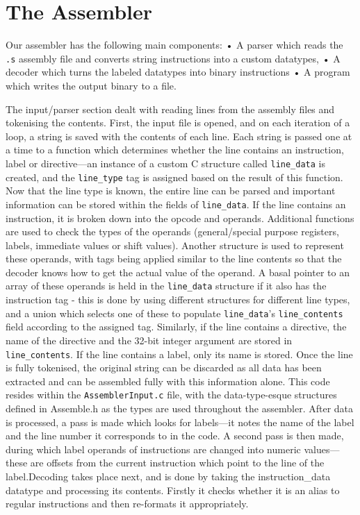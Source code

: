 \documentclass[11pt, oneside, UKenglish]{article}
\begin{document}
\section{The Assembler}
Our assembler has the following main components:
\newline • A parser which reads the \verb|.s| assembly file and converts string instructions into a custom datatypes, 
\newline • A decoder which turns the labeled datatypes into binary instructions 
\newline • A program which writes the output binary to a file.
\par The input/parser section dealt with reading lines from the assembly files and tokenising the contents.
First, the input file is opened, and on each iteration of a loop, a string is saved with the contents of each line.
Each string is passed one at a time to a function which determines whether the line contains an instruction, label or directive---an instance of a custom C structure called \verb|line_data| is created, and the \verb|line_type| tag is assigned based on the result of this function.
Now that the line type is known, the entire line can be parsed and important information can be stored within the fields of \verb|line_data|.
If the line contains an instruction, it is broken down into the opcode and operands.
Additional functions are used to check the types of the operands (general/special purpose registers, labels, immediate values or shift values). Another structure is used to represent these operands, with tags being applied similar to the line contents so that the decoder knows how to get the actual value of the operand.
A basal pointer to an array of these operands is held in the \verb|line_data| structure if it also has the instruction tag - this is done by using different structures for different line types, and a union which selects one of these to populate \verb|line_data|'s \verb|line_contents| field according to the assigned tag. Similarly, if the line contains a directive, the name of the directive and the 32-bit integer argument are stored in \verb|line_contents|.
If the line contains a label, only its name is stored. Once the line is fully tokenised, the original string can be discarded as all data has been extracted and can be assembled fully with this information alone.
This code resides within the \verb|AssemblerInput.c| file, with the data-type-esque structures defined in Assemble.h as the types are used throughout the assembler.
After data is processed, a pass is made which looks for labels---it notes the name of the label and the line number it corresponds to in the code.
A second pass is then made, during which label operands of instructions are changed into numeric values---these are offsets from the current instruction which point to the line of the label.Decoding takes place next, and is done by taking the instruction\_data datatype and processing its contents.
Firstly it checks whether it is an alias to regular instructions and then re-formats it appropriately. 
\end{document}
